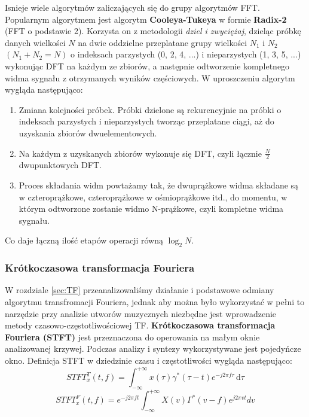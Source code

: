 \documentclass[12pt,a4paper,twoside]{mwart}
\begin{document}
Isnieje wiele algorytmów zaliczających się do grupy algorytmów FFT. Popularnym algorytmem jest algorytm \textbf{Cooleya-Tukeya} w formie \textbf{Radix-2} (FFT o podstawie 2). Korzysta on z metodologii \textit{dziel i zwyciężaj}, dzieląc próbkę danych wielkości $N$ na dwie oddzielne przeplatane grupy wielkości $N_1$ i $N_2$ $(N_1 + N_2 = N)$ o indeksach parzystych (0, 2, 4, ...) i nieparzystych (1, 3, 5, ...) wykonując DFT na każdym ze zbiorów, a następnie odtworzenie kompletnego widma sygnału z otrzymanych wyników częściowych. W uproszczeniu algorytm wygląda następująco:
\begin{enumerate}
  \item{Zmiana kolejności próbek. Próbki dzielone są rekurencyjnie na próbki o indeksach parzystych i nieparzystych tworząc przeplatane ciągi, aż do uzyskania zbiorów dwuelementowych.}
  \item{Na każdym z uzyskanych zbiorów wykonuje się DFT, czyli łącznie $\frac{N}{2}$ dwupunktowych DFT.}
  \item{Proces składania widm powtażamy tak, że dwuprążkowe widma składane są w czteroprążkowe, czteroprążkowe w ośmioprążkowe itd., do momentu, w którym odtworzone zostanie widmo N-prążkowe, czyli kompletne widma sygnału.}
\end{enumerate}
Co daje łączną ilość etapów operacji równą $\log_2 N$. \cite[241-252]{CyfrowePrzetwarzanieSygnalowOdTeoriiDoZastosowan}

\subsubsection{Krótkoczasowa transformacja Fouriera}\label{sec:STFT}
W rozdziale \ref{sec:TF} przeanalizowaliśmy działanie i podstawowe odmiany algorytmu transfromacji Fouriera, jednak aby można było wykorzystać w pełni to narzędzie przy analizie utworów muzycznych niezbędne jest wprowadzenie metody czasowo-częstotliwościowej TF. \textbf{Krótkoczasowa transformacja Fouriera (STFT)} jest przeznaczona do operowania na małym oknie analizowanej krzywej. Podczas analizy i syntezy wykorzystywane jest pojedyńcze okno. Definicja STFT w dziedzinie czasu i częstotliwości wygląda następująco:
\begin{equation} \label{STFT-equation1}
  STFT^{T}_{x}(t,f) =\int_{-\infty}^{+\infty} x(\tau)\gamma^{*}(\tau - t)e^{-j2\pi f\tau}  \,\mathrm{d}\tau
\end{equation}
\begin{equation} \label{STFT-equation2}
  STFT^{F}_{x}(t,f) = e^{-j2\pi ft} \int_{-\infty}^{+\infty} X(v) \Gamma^{*} (v-f) e^{j2\pi vt} {d}v
\end{equation}
\end{document}
